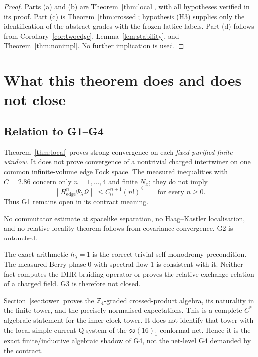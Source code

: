 \documentclass[11pt]{article}
\theoremstyle{remark}
\newcommand{\norm}[1]{\left\lVert #1\right\rVert}
\begin{document}
\begin{proof}
Parts (a) and (b) are Theorem~\ref{thm:local}, with all hypotheses
verified in its proof.  Part (c) is Theorem~\ref{thm:crossed}; hypothesis
(H3) supplies only the identification of the abstract grades with the
frozen lattice labels.  Part (d) follows from
Corollary~\ref{cor:twoedge}, Lemma~\ref{lem:stability}, and
Theorem~\ref{thm:nonimpl}.  No further implication is used.
\end{proof}

\section{What this theorem does and does not close}

\subsection{Relation to G1--G4}

\begin{description}[style=nextline]
\item[G1: convergence on the finite-particle core with energy bounds.]
Theorem~\ref{thm:local} proves strong convergence on each
\emph{fixed purified finite window}.  It does not prove convergence of
a nontrivial charged intertwiner on one common infinite-volume edge Fock
space.  The measured inequalities with $C=2.86$ concern only
$n=1,\ldots,4$ and finite $N_x$; they do not imply
\[
\norm{H_{\mathrm{edge}}^n\Psi_\lambda\Omega}
\le C_0^{n+1}(n!)^\beta\qquad\text{for every }n\ge0.
\]
Thus G1 remains open in its contract meaning.

\item[G2: locality relative to the bilinear net.]
No commutator estimate at spacelike separation, no Haag--Kastler
localisation, and no relative-locality theorem follows from covariance
convergence.  G2 is untouched.

\item[G3: braiding and monodromy.]
The exact arithmetic $h_\lambda=1$ is the correct trivial
self-monodromy precondition.  The measured Berry phase $0$ with spectral
flow $1$ is consistent with it.  Neither fact computes the DHR braiding
operator or proves the relative exchange relation of a charged field.
G3 is therefore not closed.

\item[G4: Q-system closure.]
Section~\ref{sec:tower} proves the $\mathbb Z_4$-graded crossed-product
algebra, its naturality in the finite tower, and the precisely normalised
expectations.  This is a complete $C^*$-algebraic statement for the inner
clock tower.  It does not identify that tower with the local
simple-current Q-system of the $\mathfrak{so}(16)_1$ conformal net.
Hence it is the exact finite/inductive algebraic shadow of G4, not the
net-level G4 demanded by the contract.
\end{description}
\end{document}
